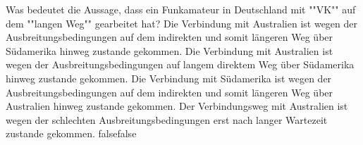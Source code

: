     {Was bedeutet die Aussage, dass ein Funkamateur in Deutschland mit ""VK"" auf dem ""langen Weg"" gearbeitet hat?}
    {Die Verbindung mit Australien ist wegen der Ausbreitungsbedingungen auf dem indirekten und somit längeren Weg über Südamerika hinweg zustande gekommen.}
    {Die Verbindung mit Australien ist wegen der Ausbreitungsbedingungen auf langem direktem Weg über Südamerika hinweg zustande gekommen.}
    {Die Verbindung mit Südamerika ist wegen der Ausbreitungsbedingungen auf dem indirekten und somit längeren Weg über Australien hinweg zustande gekommen.}
    {Der Verbindungsweg mit Australien ist wegen der schlechten Ausbreitungsbedingungen erst nach langer Wartezeit zustande gekommen.}
    {false}{false}